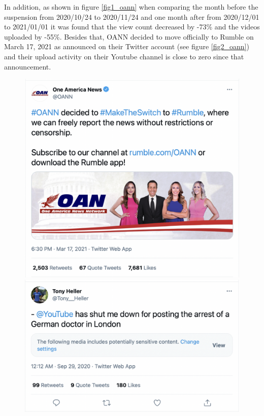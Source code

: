\documentclass{article}
\begin{document}
\smallskip

In addition, as shown in figure \ref{fig1_oann} when comparing the month before the suspension from 2020/10/24 to 2020/11/24 and one month after from 2020/12/01 to 2021/01/01 it was found that the view count decreased by -73\% and the videos uploaded by -55\%. Besides that, OANN decided to move officially to Rumble on March 17, 2021 as announced on their Twitter account (see figure \ref{fig2_oann}) and their upload activity on their Youtube channel is close to zero since that announcement. 

\begin{figure}
	\centering
		\includegraphics[scale=0.21]{./img/oann/fig3_oann.png}
		\includegraphics[scale=0.21]{./img/tony/fig3_tony.png}
	

\end{figure}
\end{document}
